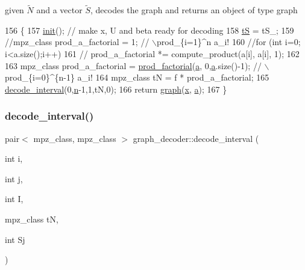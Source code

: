 given $\tilde{N}$ and a vector $\tilde{S}$, decodes the graph and returns an object of type graph 


\begin{DoxyCode}
156 \{
157   \hyperlink{classgraph__decoder_a97a9dcd5af21ece86fa91adcb41ca9cc}{init}(); \textcolor{comment}{// make x, U and beta ready for decoding }
158   \hyperlink{classgraph__decoder_ac466636b9b21122f4fa0246aa624978c}{tS} = tS\_;
159   \textcolor{comment}{//mpz\_class prod\_a\_factorial = 1; // \(\backslash\)prod\_\{i=1\}^n a\_i!}
160   \textcolor{comment}{//for (int i=0; i<a.size();i++)}
161   \textcolor{comment}{//  prod\_a\_factorial *= compute\_product(a[i], a[i], 1);}
162 
163   mpz\_class prod\_a\_factorial = \hyperlink{compression__helper_8cpp_a86d8a20e022dc06b23df3b08ac10b7d1}{prod\_factorial}(\hyperlink{classgraph__decoder_a9dd7c3c11b8a45a12cb7c3c2d2bfa2cc}{a}, 0,\hyperlink{classgraph__decoder_a9dd7c3c11b8a45a12cb7c3c2d2bfa2cc}{a}.size()-1); \textcolor{comment}{// \(\backslash\)prod\_\{i=0\}^\{n-1\} a\_i!}
164   mpz\_class tN = f * prod\_a\_factorial;
165   \hyperlink{classgraph__decoder_a2cb0bd279889a833d4c825e99eb72410}{decode\_interval}(0,\hyperlink{classgraph__decoder_a6bc1e72b2f7a913d14b789a6c2d92c1e}{n}-1,1,tN,0);
166   \textcolor{keywordflow}{return} \hyperlink{classgraph}{graph}(\hyperlink{classgraph__decoder_aa3f2776afe387668cf7f68109428e14e}{x}, \hyperlink{classgraph__decoder_a9dd7c3c11b8a45a12cb7c3c2d2bfa2cc}{a});
167 \}
\end{DoxyCode}
\mbox{\label{classgraph__decoder_a2cb0bd279889a833d4c825e99eb72410}} 
\subsubsection{\texorpdfstring{decode\+\_\+interval()}{decode\_interval()}}
{\footnotesize\ttfamily pair$<$ mpz\+\_\+class, mpz\+\_\+class $>$ graph\+\_\+decoder\+::decode\+\_\+interval (\begin{DoxyParamCaption}\item[{int}]{i,  }\item[{int}]{j,  }\item[{int}]{I,  }\item[{mpz\+\_\+class}]{tN,  }\item[{int}]{Sj }\end{DoxyParamCaption})}



